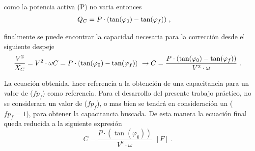                \noindent como la potencia activa (P) no varia entonces
               \begin{align}
                  Q_C   &= P\cdot (\tan(\varphi_0) - \tan(\varphi_f)) \ , \notag
               \end{align}

               \noindent finalmente se puede encontrar la capacidad necesaria para la corrección desde el siguiente despeje
               \begin{align}
                  \dfrac{V^{2}}{X_C} = V^{2}\cdot \omega C = P\cdot (\tan(\varphi_0) - \tan(\varphi_f))  \ \rightarrow C = \dfrac{P\cdot (\tan(\varphi_0) - \tan(\varphi_f))}{V^{2}\cdot \omega}~. \notag
               \end{align}

               \noindent La ecuación obtenida, hace referencia a la obtención de una capacitancia 
               para un valor de (\(fp_f\)) como referencia. Para el desarrollo del presente trabajo práctico, 
               no se considerara un valor de (\(fp_f\)), o mas bien se tendrá en consideración un (\(fp_f = 1\)), 
               para obtener la capacitancia buscada.
               De esta manera la ecuación final queda reducida a la siguiente expresión
                  \begin{equation}
                    \boxed{C = \dfrac{P\cdot (\tan(\varphi_0))}{V^{2}\cdot \omega}~~[F]}~. \label{eqn:CorrecFp}
                  \end{equation}

               
               



							












